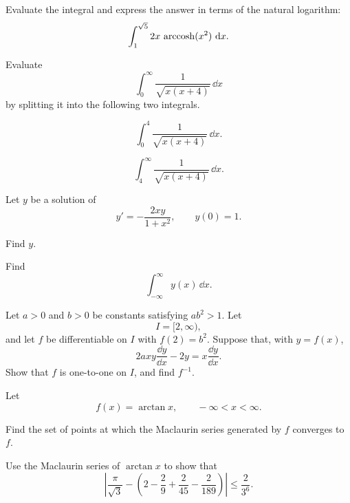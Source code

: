 \begin{problem}
Evaluate the integral and express the answer in terms of the natural logarithm:
\[
\int_1^{\sqrt5}2x\,\operatorname{arccosh}(x^2)\,\mathop{}\!\mathrm{d} x.
\]
\end{problem}

\begin{problem}
Evaluate
\[
\int_0^\infty\frac{1}{\sqrt{x(x+4)}}\,\dd x
\]
by splitting it into the following two integrals.
\begin{problemsubparts}
\item
\[
\int_0^4\frac{1}{\sqrt{x(x+4)}}\,\dd x.
\]
\item
\[
\int_4^\infty\frac{1}{\sqrt{x(x+4)}}\,\dd x.
\]
\end{problemsubparts}
\end{problem}

\begin{problem}
Let $y$ be a solution of
\[
y'=-\frac{2xy}{1+x^2},
\qquad
y(0)=1.
\]
\begin{problemsubparts}
\item Find $y$.
\item Find
\[
\int_{-\infty}^{\infty}y(x)\,\dd x.
\]
\end{problemsubparts}
\end{problem}

\begin{problem}
Let $a>0$ and $b>0$ be constants satisfying $ab^2>1$. Let
\[
I=[2,\infty),
\]
and let $f$ be differentiable on $I$ with $f(2)=b^2$. Suppose that, with $y=f(x)$,
\[
2axy\frac{\dd y}{\dd x}-2y=x\frac{\dd y}{\dd x}.
\]
Show that $f$ is one-to-one on $I$, and find $f^{-1}$.
\end{problem}


\begin{problem}
Let
\[
f(x)=\arctan x,
\qquad -\infty<x<\infty.
\]
\begin{problemsubparts}
\item Find the set of points at which the Maclaurin series generated by $f$ converges to $f$.
\item Use the Maclaurin series of $\arctan x$ to show that
\[
\left|
\frac{\pi}{\sqrt3}
-\left(2-\frac29+\frac{2}{45}-\frac{2}{189}\right)
\right|
\le\frac{2}{3^6}.
\]
\end{problemsubparts}
\end{problem}

